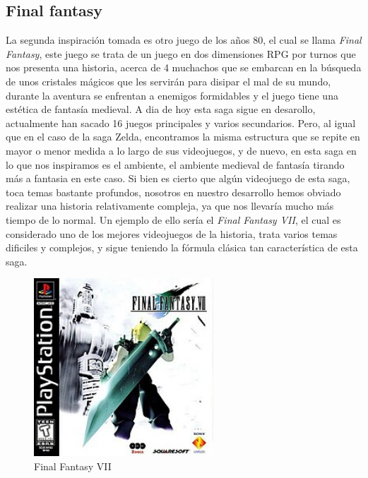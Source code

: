 \documentclass[a4paper]{article}
\begin{document}
\begin{appendices}
    \subsection{Final fantasy}
    La segunda inspiración tomada es otro juego de los años 80, el cual se llama \textit{Final Fantasy}, este juego se trata de un juego en dos dimensiones RPG por turnos que nos presenta una historia,
    acerca de 4 muchachos que se embarcan en la búsqueda de unos cristales mágicos que les servirán para disipar el mal de su mundo, durante la aventura se enfrentan a enemigos formidables y el juego tiene
    una estética de fantasía medieval. A dia de hoy esta saga sigue en desarollo, actualmente han sacado 16 juegos principales y varios secundarios.
    Pero, al igual que en el caso de la saga Zelda, encontramos la misma estructura que se repite en mayor o menor medida a lo largo de sus videojuegos, y de nuevo, en esta saga en lo que nos inspiramos es el ambiente,
    el ambiente medieval de fantasía tirando más a fantasia en este caso. Si bien es cierto que algún videojuego de esta saga, toca temas bastante profundos, nosotros en nuestro desarrollo hemos obviado realizar una historia
    relativamente compleja, ya que nos llevaría mucho más tiempo de lo normal. Un ejemplo de ello sería el \textit{Final Fantasy VII}, el cual es considerado uno de los mejores videojuegos de la historia, trata varios temas
    dificiles y complejos, y sigue teniendo la fórmula clásica tan característica de esta saga.

    \begin{figure}[ht]
        \centering
        \includegraphics[width=0.6\textwidth]{Images/Final_Fantasy_VII_Box_Art.jpg}
        \caption{Final Fantasy VII}
        \label{fig:finalfantasy}
    \end{figure}


\end{appendices}
\end{document}
